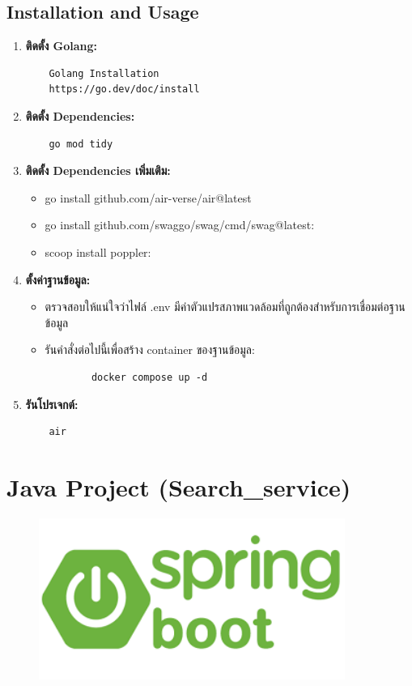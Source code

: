 \subsection{Installation and Usage}
\begin{enumerate}
    \item \textbf{ติดตั้ง Golang:}
    \begin{verbatim}
    Golang Installation 
    https://go.dev/doc/install
    \end{verbatim}
    \item \textbf{ติดตั้ง Dependencies:}
    \begin{verbatim}
    go mod tidy
    \end{verbatim}
    \item \textbf{ติดตั้ง Dependencies เพิ่มเติม:}
    \begin{itemize}
        \item go install github.com/air-verse/air@latest
        \item go install github.com/swaggo/swag/cmd/swag@latest:
        \item scoop install poppler:
    \end{itemize}
    \item \textbf{ตั้งค่าฐานข้อมูล:}
    \begin{itemize}
        \item ตรวจสอบให้แน่ใจว่าไฟล์ .env มีค่าตัวแปรสภาพแวดล้อมที่ถูกต้องสำหรับการเชื่อมต่อฐานข้อมูล
        \item รันคำสั่งต่อไปนี้เพื่อสร้าง container ของฐานข้อมูล:
        \begin{verbatim}
        docker compose up -d
        \end{verbatim}
    \end{itemize}
    \item \textbf{รันโปรเจกต์:}
    \begin{verbatim}
    air
    \end{verbatim}
\end{enumerate}

\section{Java Project (Search\_service)}
\begin{figure}[H]
    \centering
    \includegraphics[width=100mm, keepaspectratio ]{pictures/springboot.png}
\end{figure}
